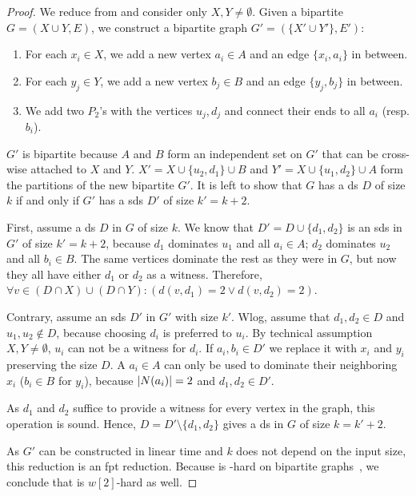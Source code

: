 \begin{proof}
    We reduce from \dom and consider only $X, Y \neq \emptyset$.
    Given a bipartite $G = ( X \cup Y, E)$, we construct a bipartite graph $G' = (\{X' \cup Y'\},E')$:
    \begin{enumerate}[topsep=0pt,itemsep=0ex,partopsep=1ex,parsep=1ex]
        \item For each $x_i \in X$, we add a new vertex $a_i \in A$  and an edge $\{x_i, a_i\}$ in between. 
        \item For each $y_j \in Y$, we add a new vertex $b_j \in B$ and an edge $\{y_j, b_j\}$ in between.
        \item We add two $P_2$'s with the vertices $u_j,d_j$ and connect their ends to all $a_i$ (resp. $b_i$).
    \end{enumerate}

    $G'$ is bipartite because $A$ and $B$ form an independent set on $G'$ that can be cross-wise attached to $X$ and $Y$. 
    $X' = X \cup \{u_2,d_1\} \cup B$ and $Y' = X \cup \{u_1,d_2\} \cup A$ form the partitions of the new bipartite $G'$.
    It is left to show that $G$ has a ds $D$ of size $k$ if and only if $G'$ has a sds $D'$ of size $k' = k + 2$.
 
    First, assume a ds $D$ in $G$ of size $k$. 
    We know that $D' = D\cup \{d_1,d_2\}$ is an sds in $G'$ of size $k' = k + 2$, because $d_1$ dominates $u_1$ and all $a_i \in A$; $d_2$ dominates $u_2$ and all $b_i \in B$. 
    The same vertices dominate the rest as they were in $G$, but now they all have either $d_1$ or $d_2$ as a witness.
    Therefore,  $\forall v \in (D \cap X) \cup (D \cap Y): (d(v, d_1) = 2 \vee d(v, d_2)=2)$.

    Contrary, assume an sds $D'$ in $G'$ with size $k'$. 
    Wlog, assume that $d_1, d_2 \in D$ and $u_1,u_2 \notin D$, because choosing $d_i$ is preferred to $u_i$.
    By technical assumption $X, Y \neq \emptyset$, $u_i$ can not be a witness for $d_i$.
    If $a_i,b_i \in D'$ we replace it with $x_i$ and $y_i$ preserving the size $D$.
    A $a_i \in A$ can only be used to dominate their neighboring $x_i$ ($b_i \in B$ for $y_i$), because $\abs{N(a_i)} = 2$ and $d_1,d_2\in D'$.

    As $d_1$ and $d_2$ suffice to provide a witness for every vertex in the graph, this operation is sound.
    Hence, $D = D' \setminus \{ d_1,d_2\}$ gives a ds in $G$ of size $ k = k' + 2$.

    As $G'$ can be constructed in linear time and $k$ does not depend on the input size, this reduction is an fpt reduction.  
    Because \dom is \WTWOhs-hard on bipartite graphs~\cite[Th. 1]{Raman2008}, we conclude that \sdom is $w[2]$-hard as well.
\end{proof}

